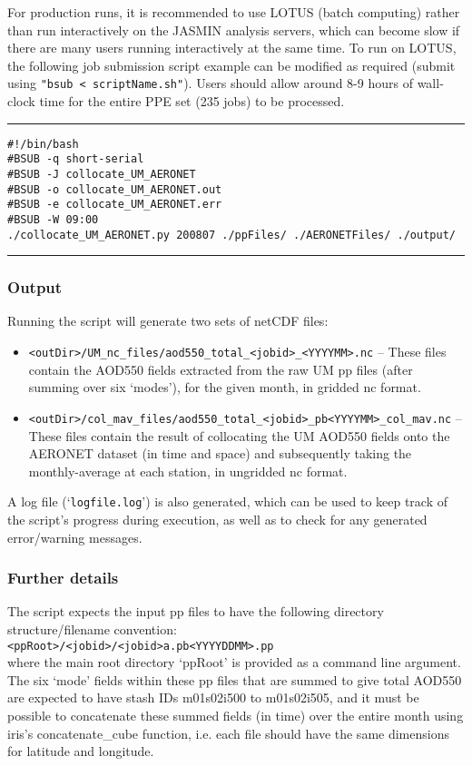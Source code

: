 \documentclass[10pt,a4paper]{article}
\newcommand\tab[1][0.5cm]{\hspace*{#1}}
\begin{document}
\noindent For production runs, it is recommended to use LOTUS (batch computing) rather than run interactively on the JASMIN analysis servers, which can become slow if there are many users running interactively at the same time. To run on LOTUS, the following job submission script example can be modified as required (submit using \texttt{"bsub < scriptName.sh"}). Users should allow around 8-9 hours of wall-clock time for the entire PPE set (235 jobs) to be processed.\\
\hrule
\begin{spacing}{1}
\begin{lstlisting}
#!/bin/bash
#BSUB -q short-serial
#BSUB -J collocate_UM_AERONET
#BSUB -o collocate_UM_AERONET.out 
#BSUB -e collocate_UM_AERONET.err 
#BSUB -W 09:00
./collocate_UM_AERONET.py 200807 ./ppFiles/ ./AERONETFiles/ ./output/
\end{lstlisting}
\end{spacing}
\hrule

\subsubsection{Output}
Running the script will generate two sets of netCDF files:
\begin{itemize}
\item \texttt{<outDir>/UM\_nc\_files/aod550\_total\_<jobid>\_<YYYYMM>.nc} -- These files contain the AOD550 fields extracted from the raw UM pp files (after summing over six `modes'), for the given month, in gridded nc format.
\item \texttt{<outDir>/col\_mav\_files/aod550\_total\_<jobid>\_pb<YYYYMM>\_col\_mav.nc} -- These files contain the result of collocating the UM AOD550 fields onto the AERONET dataset (in time and space) and subsequently taking the monthly-average at each station, in ungridded nc format.
\end{itemize}
A log file (`\texttt{logfile.log}') is also generated, which can be used to keep track of the script's progress during execution, as well as to check for any generated error/warning messages.

\subsubsection{Further details}
The script expects the input pp files to have the following directory structure/filename convention:\\
\tab \texttt{<ppRoot>/<jobid>/<jobid>a.pb<YYYYDDMM>.pp}\\
where the main root directory `ppRoot' is provided as a command line argument. The six `mode' fields within these pp files that are summed to give total AOD550 are expected to have stash IDs m01s02i500 to m01s02i505, and it must be possible to concatenate these summed fields (in time) over the entire month using iris's concatenate\_cube function, i.e. each file should have the same dimensions for latitude and longitude.\\
\end{document}
